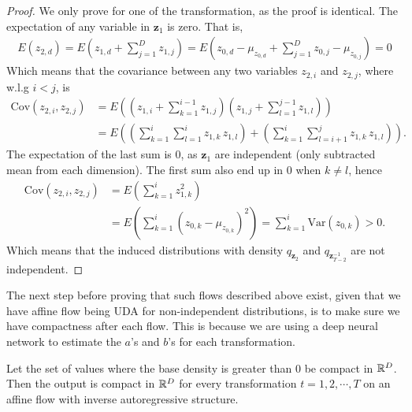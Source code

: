 \begin{proof}
    We only prove for one of the transformation, as the proof is identical. The
    expectation of any variable in \(\bm z_1\) is zero. That is,
    \begin{align*}
        E(z_{2,d}) = E\left(z_{1,d} + \sum_{j=1}^D z_{1,j}\right) 
        = E\left(z_{0,d} - \mu_{z_{0,d}} + \sum_{j=1}^D z_{0,j} - \mu_{z_{0,j}}\right) 
        = 0
    \end{align*}
    Which means that the covariance between any two variables \(z_{2,i}\) and \(z_{2,j}\), where w.l.g \(i<j\), is 
    \begin{align*}
        \text{Cov}(z_{2,i}, z_{2,j}) &= E\left(\left(z_{1,i} + \sum_{k=1}^{i-1} z_{1,j}\right) 
                                  \left(z_{1,j} + \sum_{l=1}^{j-1} z_{1,l}\right)\right)\\
                              &= E\left(\left(\sum_{k=1}^i \sum_{l=1}^i z_{1,k}\,z_{1,l}\right) + 
                                  \left(\sum_{k=1}^i \sum_{l=i+1}^j z_{1,k}\,z_{1,l}\right)\right).
    \end{align*}
    The expectation of the last sum is 0, as \(\bm z_1\) are independent (only subtracted mean from each dimension). 
    The first sum also end up in 0 when \(k \neq l\), hence
    \begin{align*}
        \text{Cov}(z_{2,i}, z_{2,j}) &= E\left(\sum_{k=1}^i z_{1,k}^2\right)\\
                                     &= E\left(\sum_{k=1}^i (z_{0,k}-\mu_{z_{0,k}})^2\right)
                                     = \sum_{k=1}^i \text{Var}(z_{0,k}) > 0.
    \end{align*}
    Which means that the induced distributions with density \(q_{\bm z_2}\) and \(q_{\bm z_{T-2}^{-1}}\) 
    are not independent.
\end{proof}
The next step before proving that such flows described above exist, given that we have affine flow being UDA
for non-independent distributions, is to make sure we have compactness after each flow. This is because we are
using a deep neural network to estimate the \(a\)'s and \(b\)'s for each transformation.
\begin{lemma}\label{lemma:compact}
    Let the set of values where the base density is greater than 0 be compact in \(\mathbb{R}^D\).
    Then the output is compact in \(\mathbb{R}^D\) for every transformation \(t=1,2,\cdots,T\) on an affine 
    flow with inverse autoregressive structure.
\end{lemma}
